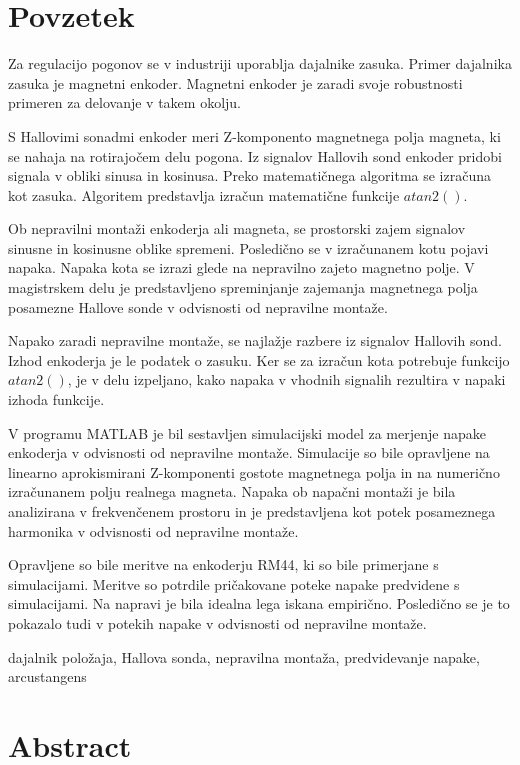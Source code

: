 \documentclass[a4paper,twoside,openright,12pt]{book}
\begin{document}
\chapter*{Povzetek}


Za regulacijo pogonov se v industriji uporablja dajalnike zasuka.
Primer dajalnika zasuka je magnetni enkoder.
Magnetni enkoder je zaradi svoje robustnosti primeren za delovanje v takem okolju.

S Hallovimi sonadmi enkoder meri Z-komponento magnetnega polja magneta, ki se nahaja na rotirajočem delu pogona.
Iz signalov Hallovih sond enkoder pridobi signala v obliki sinusa in kosinusa. Preko matematičnega algoritma se izračuna kot zasuka.
Algoritem predstavlja izračun matematične funkcije $atan2()$.

Ob nepravilni montaži enkoderja ali magneta, se prostorski zajem signalov sinusne in kosinusne oblike spremeni. Posledično se v izračunanem kotu pojavi napaka.
Napaka kota se izrazi glede na nepravilno zajeto magnetno polje. V magistrskem delu je predstavljeno spreminjanje zajemanja magnetnega polja posamezne Hallove sonde v odvisnosti od nepravilne montaže.

Napako zaradi nepravilne montaže, se najlažje razbere iz signalov Hallovih sond. Izhod enkoderja je le podatek o zasuku.
Ker se za izračun kota potrebuje funkcijo $atan2()$, je v delu izpeljano, kako napaka v vhodnih signalih rezultira v napaki izhoda funkcije.

V programu MATLAB je bil sestavljen simulacijski model za merjenje napake enkoderja v odvisnosti od nepravilne montaže.
Simulacije so bile opravljene na linearno aprokismirani Z-komponenti gostote magnetnega polja in na numerično izračunanem polju realnega magneta.
Napaka ob napačni montaži je bila analizirana v frekvenčenem prostoru in je predstavljena kot potek posameznega harmonika v odvisnosti od nepravilne montaže.

Opravljene so bile meritve na enkoderju RM44, ki so bile primerjane s simulacijami. Meritve so potrdile pričakovane poteke napake predvidene s simulacijami. Na napravi je bila idealna lega iskana empirično. Posledično se je to pokazalo tudi v potekih napake v odvisnosti od nepravilne montaže.

\kljucnebesede  dajalnik položaja, Hallova sonda, nepravilna montaža, predvidevanje napake, arcustangens
\chapter*{Abstract}
\end{document}
